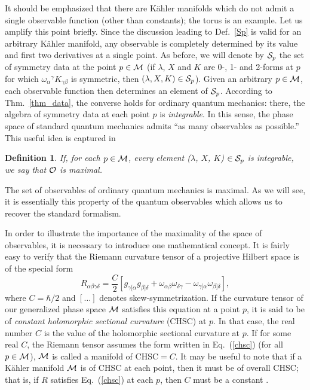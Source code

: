 \documentclass[12pt,aps,eqsecnum,tighten]{revtex4-2}
\newtheorem{definition}{Definition}[section]
\def\be{\begin{equation}}
\def\ee{\end{equation}}
\def\a{\alpha}
\def\b{\beta}
\def\c{\gamma}
\def\M{{\cal M}}
\def\w{\omega}
\newcommand{\eqn}[1]{Eq.~(\ref{#1})}
\begin{document}
It should be emphasized that there are K\"ahler manifolds which do not
admit a single observable function (other than constants); the torus
is an example.  Let us amplify this point briefly.  Since the
discussion leading to Def.~\ref{Sp} is valid for an arbitrary K\"ahler
manifold, any observable is completely determined by its value and
first two derivatives at a single point.  As before, we will denote by
${\cal S}_p$ the set of symmetry data at the point $p \in \M $ (if
$\lambda$, $X$ and $K$ are 0-, 1- and 2-forms at $p$ for which
$\w_{\a}{}^{\c}K_{\c\b}$ is symmetric, then $(\lambda, X, K) \in {\cal
S}_p$).  Given an arbitrary $p\in\M$, each observable function then
determines an element of ${\cal S}_p$.  According to
Thm.~\ref{thm_data}, the converse holds for ordinary quantum
mechanics: there, the algebra of symmetry data at each point $p$ is
{\em integrable}.  In this sense, the phase space of standard quantum
mechanics admits ``as many observables as possible.''  This useful
idea is captured in
%
\begin{definition}
If, for each $p \in \M$, every element ($\lambda$, $X$, $K$)
$\in {\cal S}_p$ is integrable, we say that ${\cal O}$ is
{\em maximal}.
\end{definition}
%
\noindent
The set of observables of ordinary quantum mechanics is maximal.  As
we will see, it is essentially this property of the quantum
observables which allows us to recover the standard formalism.

In order to illustrate the importance of the maximality of the space
of observables, it is necessary to introduce one mathematical concept.
It is fairly easy to verify that the Riemann curvature tensor of a
projective Hilbert space is of the special form
%
\be \label{chsc}
R_{\a\b\c\delta} = \frac{C}{2} \left[
g_{\c[\a} g_{\b]\delta} + \w_{\a\b} \w_{\delta\c} -
\w_{\c[\a} \w_{\b]\delta}  \right],
\ee
%
where $C = \hbar / 2$ and $[\ldots]$ denotes skew-symmetrization.  If
the curvature tensor of our generalized 
phase space $\M$ satisfies this equation at a point $p$, it is said to
be of {\em constant holomorphic sectional curvature} (CHSC) at $p$.
In that case, the real number $C$ is the value of the holomorphic
sectional curvature at $p$.  If for some real $C$, the Riemann tensor
assumes the form written in \eqn{chsc} (for all $p\in\M$), $\M$ is
called a manifold of CHSC$=C$.  It may be useful to note that if a
K\"ahler manifold $\M$ is of CHSC at each point, then it must be of
overall CHSC; that is, if $R$ satisfies \eqn{chsc} at each $p$, then
$C$ must be a constant \cite{yano}.
\end{document}
